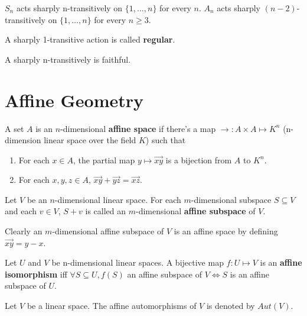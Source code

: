 \documentclass[12pt]{book}
\begin{document}
\begin{lemma}
	$S_n$ acts sharply n-transitively on $\{1,\dots,n\}$ for every $n$. $A_n$ acts sharply $(n-2)$-transitively on $\{1,\dots,n\}$ for every $n\geq 3$.
\end{lemma}

\begin{definition}
	A sharply 1-transitive action is called {\bf regular}.
\end{definition}

\begin{lemma}
	A sharply n-transitively is faithful.
\end{lemma}


\section{Affine Geometry}

\begin{definition}
	A set $A$ is an $n$-dimensional {\bf affine space} if there's a map $\rightarrow:A\times A\mapsto K^n$ (n-dimension linear space over the field $K$) such that 
	\begin{enumerate}
		\item For each $x\in A$, the partial map $y\mapsto\overrightarrow{xy}$ is a bijection from $A$ to $ K^n$.
		\item For each $x,y,z\in A$, $\overrightarrow{xy}+\overrightarrow{yz}=\overrightarrow{xz}$.
	\end{enumerate}
\end{definition}

\begin{definition}
	Let $V$ be an $n$-dimensional linear space. For each $m$-dimensional subspace $S\subseteq V$ and each $v\in V$, $S+v$ is called an $m$-dimensional {\bf affine subspace} of $V$.
\end{definition}
Clearly an $m$-dimensional affine subspace of $V$ is an affine space by defining $\overrightarrow{xy}=y-x$.

\begin{definition}
	Let $U$ and $V$ be n-dimensional linear spaces. A bijective map $f:U\mapsto V$ is an {\bf affine isomorphism} iff $\forall S\subseteq U,f(S)$ an affine subspace of $V\Leftrightarrow S$ is an affine subspace of $U$.
\end{definition}

\begin{definition}
	Let $V$ be a linear space. The affine automorphisms of $V$ is denoted by $Aut(V)$.
\end{definition}
\end{document}
